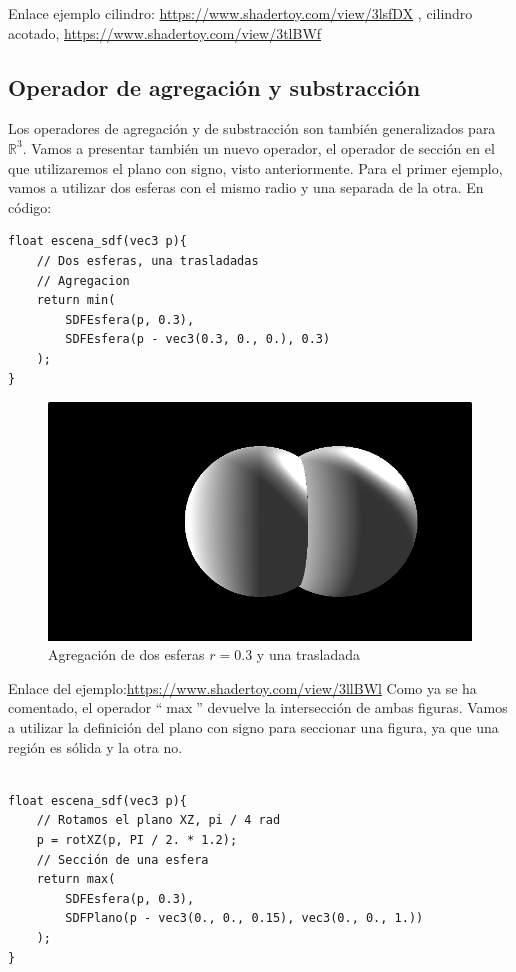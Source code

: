 Enlace ejemplo cilindro:
\url{https://www.shadertoy.com/view/3lsfDX}
, cilindro acotado,
\url{https://www.shadertoy.com/view/3tlBWf}

\subsection{Operador de agregación y substracción}
Los operadores de agregación y de substracción son también generalizados para \(\mathbb{R}^3\). Vamos a presentar también un nuevo operador, el operador de sección en el que utilizaremos el plano con signo, visto anteriormente. Para el primer ejemplo, vamos a utilizar dos esferas con el mismo radio y una separada de la otra. En código:
\begin{lstlisting}
float escena_sdf(vec3 p){
    // Dos esferas, una trasladadas
    // Agregacion
    return min(
        SDFEsfera(p, 0.3),
        SDFEsfera(p - vec3(0.3, 0., 0.), 0.3)
    );
}
\end{lstlisting}
\begin{figure}[H]
  \centering
  \captionsetup{justification=centering}%
  \includegraphics[width=1.0\textwidth]{secciones/imagenes/sdf/3d/sdf_add_3d.png}
  \caption{Agregación de dos esferas \(r=0.3\) y una trasladada}
  \label{fig:add3d}
\end{figure}

Enlace del ejemplo:\url{https://www.shadertoy.com/view/3llBWl}
Como ya se ha comentado, el operador \enquote{\(\max\)} devuelve la intersección de ambas figuras. Vamos a utilizar la definición del plano con signo para seccionar una figura, ya que una región es sólida y la otra no. \\\\

\begin{lstlisting}
float escena_sdf(vec3 p){
    // Rotamos el plano XZ, pi / 4 rad
    p = rotXZ(p, PI / 2. * 1.2);
	// Sección de una esfera
    return max(
        SDFEsfera(p, 0.3),
        SDFPlano(p - vec3(0., 0., 0.15), vec3(0., 0., 1.))
    );
}
\end{lstlisting}

